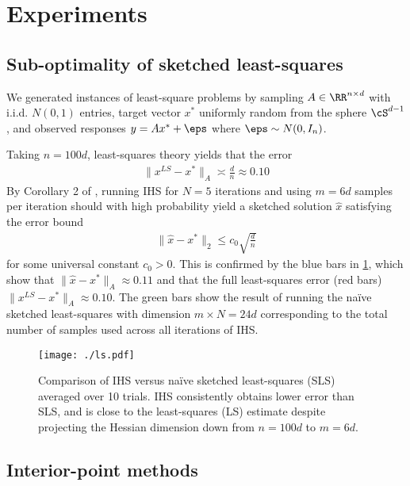 \documentclass[12pt,letterpaper,boxed]{article}
\begin{document}
\section{Experiments}

\subsection{Sub-optimality of sketched least-squares}

We generated instances of least-square problems by sampling
$A \in \RR^{n \times d}$ with i.i.d. $N(0,1)$ entries,
target vector $x^*$ uniformly random from the sphere $\cS^{d-1}$,
and observed responses $y = A x^* + \eps$ where $\eps \sim N(0, I_n)$.

Taking $n = 100d$, least-squares theory yields that the error
\begin{align}
  \|x^{LS} - x^*\|_A \asymp \frac{d}{n} \approx 0.10
\end{align}
By Corollary 2 of \cite{pilanci2016iterative}, running IHS for $N = 5$ iterations
and using $m = 6d$ samples per iteration should with high probability yield a sketched solution $\hat{x}$
satisfying the error bound
\begin{align}
  \|\hat{x} - x^*\|_2 \leq c_0 \sqrt{\frac{d}{n}}
\end{align}
for some universal constant $c_0 > 0$. This is confirmed by the blue bars in \cref{fig:ls},
which show that $\|\hat{x} - x^*\|_A \approx 0.11$ and that the
full least-squares error (red bars) $\|x^{LS} - x^*\|_A \approx 0.10$.
The green bars show the result of running the na\"ive sketched least-squares
with dimension $m \times N = 24 d$ corresponding to the total number of samples
used across all iterations of IHS.

\begin{figure}[htpb]
  \centering
  \texttt{[image: ./ls.pdf]}
  \caption{Comparison of IHS versus na\"ive sketched least-squares (SLS) averaged
    over 10 trials.
    IHS consistently obtains lower error than SLS, and is close to the least-squares (LS)
    estimate despite projecting the Hessian dimension down from $n=100d$ to $m=6d$.}
  \label{fig:ls}
\end{figure}

\subsection{Interior-point methods}
\end{document}
